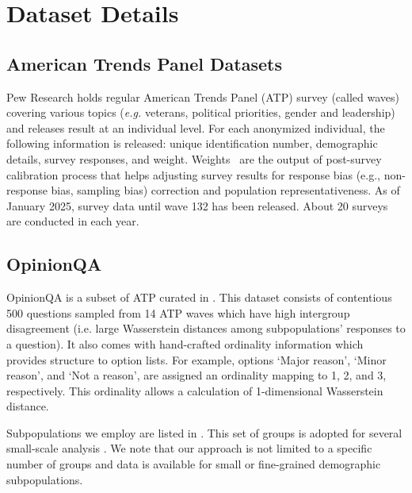 \section{Dataset Details}
\label{appendix_dataset}

\subsection{American Trends Panel Datasets}
\label{appendix_atp_dataset}
Pew Research holds regular American Trends Panel (ATP) survey (called waves)~\cite{atp} covering various topics (\textit{e.g.} veterans, political priorities, gender and leadership) and releases result at an individual level.
For each anonymized individual, the following information is released: unique identification number, demographic details, survey responses, and weight.
Weights~\cite{mercer2018weighting} are the output of post-survey calibration process that helps adjusting survey results for response bias (e.g., non-response bias, sampling bias) correction and population representativeness.
As of January 2025, survey data until wave 132 has been released. About 20 surveys are conducted in each year.

\subsection{OpinionQA}
\label{appendix_opinionqa}
OpinionQA is a subset of ATP curated in \cite{santurkar2023whose}. This dataset consists of contentious 500 questions sampled from 14 ATP waves which have high intergroup disagreement (i.e. large Wasserstein distances among subpopulations' responses to a question). It also comes with hand-crafted ordinality information which provides structure to option lists. For example, options `Major reason', `Minor reason', and `Not a reason',
are assigned an ordinality mapping to 1, 2, and 3, respectively.
This ordinality allows a calculation of 1-dimensional Wasserstein distance.

Subpopulations we employ are listed in . This set of groups is adopted for several small-scale analysis \cite{santurkar2023whose, zhao2023group, kim2024few}.
We note that our approach is not limited to a specific number of groups and data is available for small or fine-grained demographic subpopulations.


\newpage


